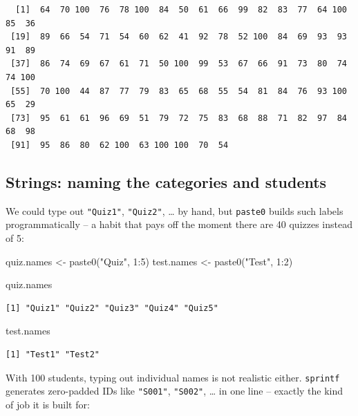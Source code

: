 \documentclass[
  letterpaper,
  DIV=11,
  numbers=noendperiod]{scrreprt}
\newenvironment{Shaded}{\begin{snugshade}}{\end{snugshade}}
\newcommand{\DecValTok}[1]{\textcolor[rgb]{0.68,0.00,0.00}{#1}}
\newcommand{\FunctionTok}[1]{\textcolor[rgb]{0.28,0.35,0.67}{#1}}
\newcommand{\NormalTok}[1]{\textcolor[rgb]{0.00,0.23,0.31}{#1}}
\newcommand{\OtherTok}[1]{\textcolor[rgb]{0.00,0.23,0.31}{#1}}
\newcommand{\SpecialCharTok}[1]{\textcolor[rgb]{0.37,0.37,0.37}{#1}}
\newcommand{\StringTok}[1]{\textcolor[rgb]{0.13,0.47,0.30}{#1}}
\begin{document}
\begin{verbatim}
  [1]  64  70 100  76  78 100  84  50  61  66  99  82  83  77  64 100  85  36
 [19]  89  66  54  71  54  60  62  41  92  78  52 100  84  69  93  93  91  89
 [37]  86  74  69  67  61  71  50 100  99  53  67  66  91  73  80  74  74 100
 [55]  70 100  44  87  77  79  83  65  68  55  54  81  84  76  93 100  65  29
 [73]  95  61  61  96  69  51  79  72  75  83  68  88  71  82  97  84  68  98
 [91]  95  86  80  62 100  63 100 100  70  54
\end{verbatim}

\subsection{Strings: naming the categories and
students}\label{strings-naming-the-categories-and-students}

We could type out \texttt{"Quiz1"}, \texttt{"Quiz2"}, \ldots{} by hand,
but \texttt{paste0} builds such labels programmatically -- a habit that
pays off the moment there are 40 quizzes instead of 5:

\begin{Shaded}
\begin{Highlighting}[]
\NormalTok{quiz.names }\OtherTok{\textless{}{-}} \FunctionTok{paste0}\NormalTok{(}\StringTok{"Quiz"}\NormalTok{, }\DecValTok{1}\SpecialCharTok{:}\DecValTok{5}\NormalTok{)}
\NormalTok{test.names }\OtherTok{\textless{}{-}} \FunctionTok{paste0}\NormalTok{(}\StringTok{"Test"}\NormalTok{, }\DecValTok{1}\SpecialCharTok{:}\DecValTok{2}\NormalTok{)}

\NormalTok{quiz.names}
\end{Highlighting}
\end{Shaded}

\begin{verbatim}
[1] "Quiz1" "Quiz2" "Quiz3" "Quiz4" "Quiz5"
\end{verbatim}

\begin{Shaded}
\begin{Highlighting}[]
\NormalTok{test.names}
\end{Highlighting}
\end{Shaded}

\begin{verbatim}
[1] "Test1" "Test2"
\end{verbatim}

With 100 students, typing out individual names is not realistic either.
\texttt{sprintf} generates zero-padded IDs like \texttt{"S001"},
\texttt{"S002"}, \ldots{} in one line -- exactly the kind of job it is
built for:
\end{document}
